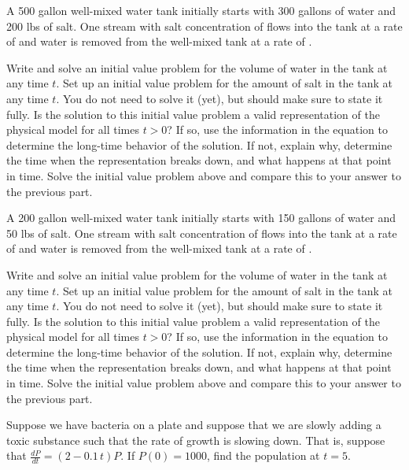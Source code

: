 \begin{exercise}
A 500 gallon well-mixed water tank initially starts with 300 gallons of water and 200 lbs of salt. One stream with salt concentration of  flows into the tank at a rate of  and water is removed from the well-mixed tank at a rate of .
\begin{tasks}
\task Write and solve an initial value problem for the volume of water in the tank at any time $t$.
\task Set up an initial value problem for the amount of salt in the tank at any time $t$. You do not need to solve it (yet), but should make sure to state it fully.
\task Is the solution to this initial value problem a valid representation of the physical model for all times $t > 0$? If so, use the information in the equation to determine the long-time behavior of the solution. If not, explain why, determine the time when the representation breaks down, and what happens at that point in time.
\task Solve the initial value problem above and compare this to your answer to the previous part.
\end{tasks}
\end{exercise}

\begin{exercise}
A 200 gallon well-mixed water tank initially starts with 150 gallons of water and 50 lbs of salt. One stream with salt concentration of  flows into the tank at a rate of  and water is removed from the well-mixed tank at a rate of .
\begin{tasks}
\task Write and solve an initial value problem for the volume of water in the tank at any time $t$.
\task Set up an initial value problem for the amount of salt in the tank at any time $t$. You do not need to solve it (yet), but should make sure to state it fully.
\task Is the solution to this initial value problem a valid representation of the physical model for all times $t > 0$? If so, use the information in the equation to determine the long-time behavior of the solution. If not, explain why, determine the time when the representation breaks down, and what happens at that point in time.
\task Solve the initial value problem above and compare this to your answer to the previous part.
\end{tasks}
\end{exercise}

\begin{exercise}\ansMark%
Suppose we have bacteria on a plate and suppose that we are slowly adding
a toxic substance such that the rate of growth is slowing down.  That is,
suppose that $\frac{dP}{dt} = (2-0.1\,t)P$.  If $P(0) = 1000$, find
the population at $t=5$.
\end{exercise}

